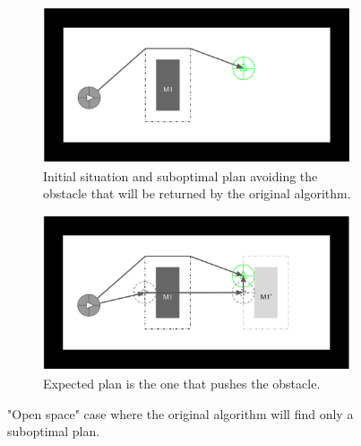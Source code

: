 \begin{figure}[H]
\centering
\begin{subfigure}{.5\textwidth}
  \centering
  \includegraphics[width=\linewidth]{Figures/Check_New_Opening/openspace_original.png}
  \caption{Initial situation and suboptimal plan avoiding the obstacle that will be returned by the original algorithm.}
  \label{fig:openspace_original}
\end{subfigure}%
\begin{subfigure}{.5\textwidth}
  \centering
  \includegraphics[width=\linewidth]{Figures/Check_New_Opening/openspace_optimal_path.png}
  \caption{Expected plan is the one that pushes the obstacle.}
  \label{fig:openspace_optimal_path}
\end{subfigure}
\caption{"Open space" case where the original algorithm will find only a suboptimal plan.}
\label{fig:openspace_case}
\end{figure}

